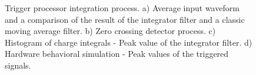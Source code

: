 \begin{figure}[h]
\centering
{}
\caption[]{Trigger processor integration process. a) Average input waveform and a comparison of the result of the integrator filter and a classic moving average filter. b) Zero crossing detector process. c) Histogram of charge integrals - Peak value of the integrator filter. d) Hardware behavioral simulation - Peak values of the triggered signals.}
\label{fig:filter_figures}
\end{figure}

